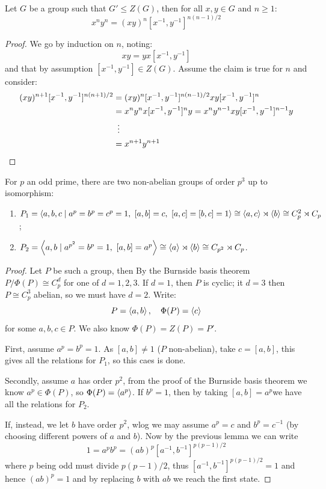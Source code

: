 \documentclass{article}
\begin{document}
\begin{lemma}
    Let $G$ be a group such that $G'\leq Z(G)$, then for all $x,y\in G$ and $n\geq 1$: \[
        x^ny^n = (xy)^n[x^{-1},y^{-1}]^{n(n-1)/2}
    \]\begin{proof}
        We go by induction on $n$, noting:\[
        xy = yx[x^{-1},y^{-1}]
        \] and that by assumption $[x^{-1},y^{-1}]\in Z(G)$. Assume the claim is true for $n$ and consider: \begin{align*}
            (xy)^{n+1}[x^{-1},y^{-1}]^{n(n+1)/2} &= (xy)^n[x^{-1},y^{-1}]^{n(n-1)/2}xy[x^{-1},y^{-1}]^n \\
            &= x^ny^nx[x^{-1},y^{-1}]^ny = x^ny^{n-1}xy[x^{-1},y^{-1}]^{n-1}y \\
            &\ \vdots \\
            &= x^{n+1}y^{n+1}\qedhere
        \end{align*}
    \end{proof}
\end{lemma}

\begin{theorem}
    For $p$ an odd prime, there are two non-abelian groups of order $p^3$ up to isomorphism: \begin{enumerate}
        \item $P_1 = \abr{a,b,c \mid a^p=b^p=c^p=1,\ [a,b]=c,\ [a,c]=[b,c]=1}\cong \abr{a,c}\rtimes\abr{b}\cong C_p^2\rtimes C_p$;
        \item $P_2 = \abr{a,b \mid a^{p^2}=b^p=1,\ [a,b]=a^p} \cong \abr{a}\rtimes\abr{b}\cong C_{p^2}\rtimes C_p$.
    \end{enumerate}
    \begin{proof}
        Let $P$ be such a group, then By the Burnside basis theorem $P/\Phi(P)\cong C_p^d$ for one of $d=1,2,3$. If $d=1$, then $P$ is cyclic; it $d=3$ then $P\cong C_p^3$ abelian, so we must have $d=2$. Write: \[
        P = \left\langle a,b \right\rangle, \quad \Phi(P) = \left\langle c \right\rangle
        \] for some $a,b,c\in P$. We also know $\Phi(P) = Z(P) = P'$.

        First, assume $a^p=b^p=1$. As $[a,b]\neq 1$ ($P$ non-abelian), take $c=[a,b]$, this gives all the relations for $P_1$, so this caes is done.

        Secondly, assume $a$ has order $p^2$, from the proof of the Burnside basis theorem we know $a^p\in \Phi(P)$, so $\Phi(P) = \left\langle a^p \right\rangle$. If $b^p=1$, then by taking $[a,b]=a^p$we have all the relations for $P_2$.

        If, instead, we let $b$ have order $p^2$, wlog we may assume $a^p = c$ and $b^p = c^{-1}$ (by choosing different powers of $a$ and $b$). Now by the previous lemma we can write \[
        1 = a^pb^p = (ab)^p[a^{-1},b^{-1}]^{p(p-1)/2}
        \] where $p$ being odd must divide $p(p-1)/2$, thus $[a^{-1},b^{-1}]^{p(p-1)/2}=1$ and hence $(ab)^p=1$ and by replacing $b$ with $ab$ we reach the first state.
    \end{proof}
\end{theorem}
\end{document}
